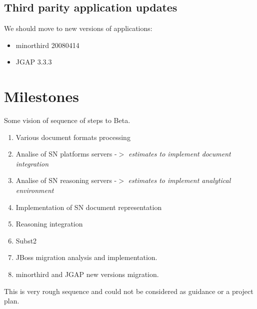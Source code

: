 \documentclass[12pt]{article}
\begin{document}
\subsection{Third parity application updates}
We should move to new versions of applications:
\begin{itemize}
  \item minorthird 20080414
  \item JGAP 3.3.3
\end{itemize}

\section{Milestones}
Some vision of sequence of steps to Beta.
\begin{enumerate}
  \item Various document formats processing
  \item Analise of SN platforms servers -$>$ \emph{estimates to implement document integration}
  \item Analise of SN reasoning servers -$>$ \emph{estimates to implement analytical environment}
  \item Implementation of SN document representation
  \item Reasoning integration
  \item Subst2
  \item JBoss migration analysis and implementation.
  \item minorthird and JGAP new versions migration.
\end{enumerate}
This is very rough sequence and could not be considered as guidance or a project plan.
\end{document}
